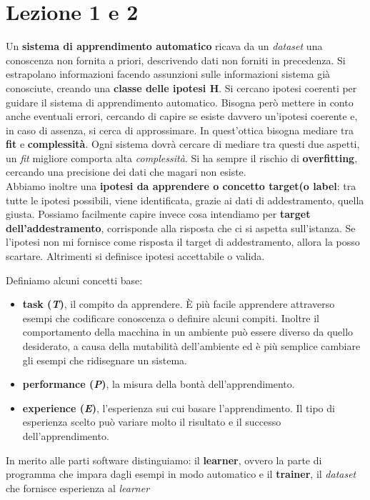 \section{Lezione 1 e 2}
Un \textbf{sistema di apprendimento automatico} ricava da un \textit{dataset} una conoscenza non fornita a priori, descrivendo dati non forniti in precedenza. Si estrapolano informazioni facendo assunzioni sulle informazioni sistema già conosciute, creando una \textbf{classe delle ipotesi H}. Si cercano ipotesi coerenti per guidare il sistema di apprendimento automatico. Bisogna però mettere in conto anche eventuali errori, cercando di capire se esiste davvero un'ipotesi coerente e, in caso di assenza, si cerca di approssimare. In quest'ottica bisogna mediare tra \textbf{fit} e \textbf{complessità}. Ogni sistema dovrà cercare di mediare tra questi due aspetti, un \textit{fit} migliore comporta alta \textit{complessità}. Si ha sempre il rischio di \textbf{overfitting}, cercando una precisione dei dati che magari non esiste.\\
    
Abbiamo inoltre una \textbf{ipotesi da apprendere \textnormal{o} concetto target(o label}: tra tutte le ipotesi possibili, viene identificata, grazie ai dati di addestramento, quella giusta. Possiamo facilmente capire invece cosa intendiamo per \textbf{target dell’addestramento}, corrisponde alla risposta che ci si aspetta sull’istanza. Se l’ipotesi non mi fornisce come risposta il target di addestramento, allora la posso scartare. Altrimenti si definisce ipotesi accettabile o valida.

Definiamo alcuni concetti base: 
\begin{itemize} 
    \item \textbf{task (\textit{T})}, il compito da apprendere. È più facile apprendere attraverso esempi che codificare conoscenza o definire alcuni compiti. Inoltre il comportamento della macchina in un ambiente può essere diverso da quello desiderato, a causa della mutabilità dell'ambiente ed è più semplice cambiare gli esempi che ridisegnare un sistema.
    \item \textbf{performance (\textit{P})}, la misura della bontà dell'apprendimento.
    \item \textbf{experience (\textit{E})}, l'esperienza sui cui basare l'apprendimento. Il tipo di esperienza scelto può variare molto il risultato e il successo dell'apprendimento. 
\end{itemize}

In merito alle parti software distinguiamo: il
  \textbf{learner}, ovvero la parte di programma che impara dagli esempi in modo   automatico e il  \textbf{trainer}, il \textit{dataset} che fornisce esperienza al \textit{learner}

